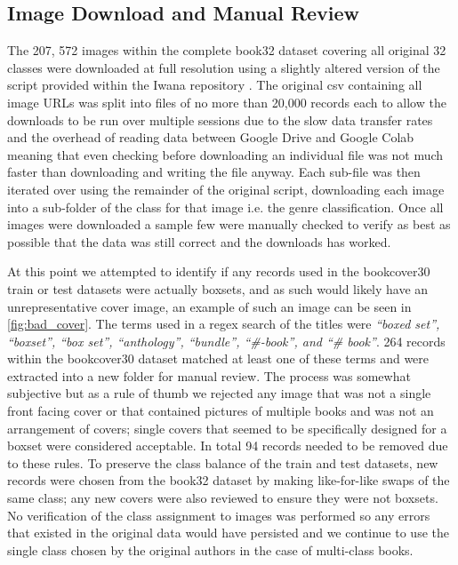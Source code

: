 \documentclass[12pt]{article}
\numberwithin{equation}{section}
\numberwithin{figure}{section}
\begin{document}
\subsection{Image Download and Manual Review} 
\label{sub:Image Download and Manual Review} 
The 207, 572 images within the complete book32 dataset covering all original 32 classes were downloaded at full resolution using a slightly altered version of the script provided within the Iwana repository \cite{iwanarepo}. The original csv containing all image URLs was split into files of no more than 20,000 records each to allow the downloads to be run over multiple sessions due to the slow data transfer rates and the overhead of reading data between Google Drive and Google Colab meaning that even checking before downloading an individual file was not much faster than downloading and writing the file anyway. Each sub-file was then iterated over using the remainder of the original script, downloading each image into a sub-folder of the class for that image i.e. the genre classification. Once all images were downloaded a sample few were manually checked to verify as best as possible that the data was still correct and the downloads has worked. 

At this point we attempted to identify if any records used in the bookcover30 train or test datasets were actually boxsets, and as such would likely have an unrepresentative cover image, an example of such an image can be seen in \cref{fig:bad_cover}. The terms used in a regex search of the titles were \emph{``boxed set'', ``boxset'', ``box set'', ``anthology'', ``bundle'', ``\#-book'', and ``\# book''}. 264 records within the bookcover30 dataset matched at least one of these terms and were extracted into a new folder for manual review. The process was somewhat subjective but as a rule of thumb we rejected any image that was not a single front facing cover or that contained pictures of multiple books and was not an arrangement of covers; single covers that seemed to be specifically designed for a boxset were considered acceptable. In total 94 records needed to be removed due to these rules. To preserve the class balance of the train and test datasets, new records were chosen from the book32 dataset by making like-for-like swaps of the same class; any new covers were also reviewed to ensure they were not boxsets. No verification of the class assignment to images was performed so any errors that existed in the original data would have persisted and we continue to use the single class chosen by the original authors in the case of multi-class books.
\end{document}
